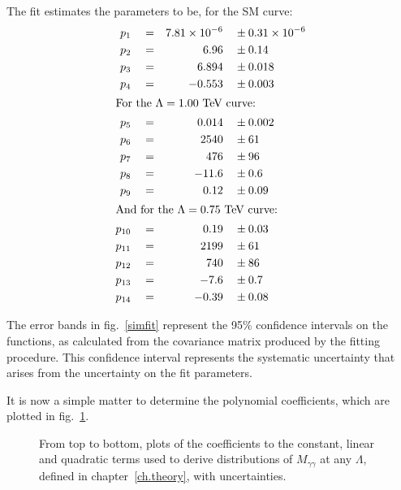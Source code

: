 The fit estimates the parameters to be, for the SM curve:\allowdisplaybreaks
\begin{align*}
p_1                      & \quad = &  7.81\times10^{-6}   \quad & \pm    0.31\times10^{-6} \\
p_2                      & \quad = &      6.96   \quad & \pm    0.14    \\
p_3                      & \quad = &      6.894   \quad & \pm    0.018    \\
p_4                      & \quad = &    -0.553   \quad & \pm    0.003  \\
\intertext{For the $\Lambda = 1.00$ TeV curve:}
p_5                      & \quad = &     0.014   \quad & \pm    0.002  \\
p_6                      & \quad = &      2540   \quad & \pm    61     \\
p_7                      & \quad = &      476   \quad & \pm    96     \\
p_8                      & \quad = &     -11.6   \quad & \pm    0.6   \\
p_9                      & \quad = &     0.12   \quad & \pm    0.09   \\
\intertext{And for the $\Lambda=0.75$ TeV curve:}
p_{10}                     & \quad = &     0.19   \quad & \pm    0.03   \\
p_{11}                     & \quad = &      2199   \quad & \pm    61     \\
p_{12}                     & \quad = &      740   \quad & \pm    86     \\
p_{13}                     & \quad = &     -7.6   \quad & \pm    0.7    \\
p_{14}                     & \quad = &    -0.39   \quad & \pm    0.08   
\end{align*}

The error bands in fig.~\ref{simfit} represent the 95\% confidence intervals on the functions, as calculated from the covariance matrix produced by the fitting procedure. This confidence interval represents the systematic uncertainty that arises from the uncertainty on the fit parameters.

It is now a simple matter to determine the polynomial coefficients, which are plotted in fig.~\ref{coef}.

\begin{figure}[hbt]
\begin{minipage}[b]{.69\textwidth}
\begin{infilsf}\tiny

\end{infilsf}
\end{minipage}\hfill
\begin{minipage}[b]{.3\textwidth}
\caption{From top to bottom, plots of the coefficients to the constant, linear and quadratic terms used to derive distributions of $M_{\gamma\gamma}$ at any $\Lambda$, defined in chapter~\ref{ch.theory}, with uncertainties.}\label{coef}
\end{minipage}
\end{figure}

